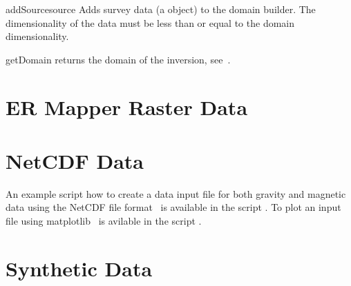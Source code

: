 \begin{methoddesc}[DomainBuilder]{addSource}{source}
    Adds survey data  (a  object) to the domain
    builder. The dimensionality of the data must be less than or equal to the
    domain dimensionality.
\end{methoddesc}

\begin{methoddesc}[DomainBuilder]{getDomain}{}
returns the \escript domain of the inversion, see~\cite{ESCRIPT}.
\end{methoddesc}

\section{ER Mapper Raster Data}

\section{NetCDF Data}
An example script how to create a data input file for both gravity and magnetic data using the NetCDF file format~\cite{netcdf}
is available in the script . To plot an input file using matplotlib~\cite{matplotlib} 
is avilable in the script .

\section{Synthetic Data}

